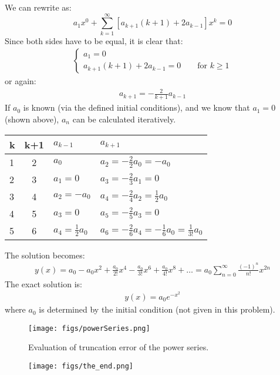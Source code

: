 \begin{exmp}{}
\begin{enumerate}
We can rewrite as:
\begin{equation*}
a_1x^0+ \sum^\infty_{k=1}\left[ a_{k+1} (k+1)+ 2 a_{k-1}\right]x^{k}=0
\end{equation*}
Since both sides have to be equal, it is clear that:
\begin{align*}
 \begin{cases}
a_1=0\\
a_{k+1}(k+1)+2a_{k-1}=0 \qquad \text{for } k\geq 1
\end{cases}
\end{align*}
or again:
\begin{align*}
a_{k+1}=-\frac{2}{k+1}a_{k-1}
\end{align*}
If $a_0$ is known (via the defined initial conditions), and we know that $a_1=0$ (shown above), $a_n$ can be calculated iteratively.

\begin{tabular}{ l c l l}
k &k+1& $a_{k-1}$     & $a_{k+1}$\\ \hline
1 & 2 & $a_0$         & $a_2 = -\frac{2}{2}a_0=-a_0$\\ 
2 & 3 & $a_1=0$       & $a_3=-\frac{2}{3} a_1=0$ \\
3 & 4 & $a_2=-a_0$    & $a_4=-\frac{2}{4} a_2=\frac{1}{2}a_0$ \\
4 & 5 & $a_3=0$       & $a_5=-\frac{2}{5} a_3=0$ \\
5 & 6 & $a_4 =\frac{1}{2}a_0$ & $a_6=-\frac{2}{6} a_4=-\frac{1}{6}a_0 =\frac{1}{3!}a_0 $ \\
\end{tabular}
The solution becomes:
\begin{align*}
y(x)=a_0-a_0x^2+\frac{a_0}{2!}x^4-\frac{a_0}{3!}x^6+\frac{a_0}{4!}x^8 +\hdots= a_0\sum^\infty_{n=0}\frac{(-1)^n}{n!}x^{2n}
\end{align*}
The exact solution is:
\begin{align*}
y(x)=a_0e^{-x^2}
\end{align*}
where $a_0$ is determined by the initial condition (not given in this problem).
\begin{figure}[h!]
\centering
\texttt{[image: figs/powerSeries.png]}
\caption{Evaluation of truncation error of the power series.}
\end{figure}
\end{enumerate}
\end{exmp}

\begin{figure}[h!]
\centering
\texttt{[image: figs/the\_end.png]}
\end{figure}

